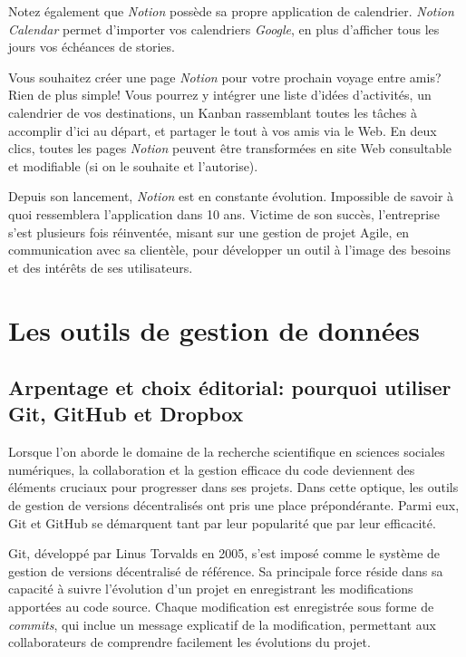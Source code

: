 \documentclass[
  letterpaper,
  DIV=11,
  numbers=noendperiod]{scrreprt}
\begin{document}
Notez également que \emph{Notion} possède sa propre application de
calendrier. \emph{Notion Calendar} permet d'importer vos calendriers
\emph{Google}, en plus d'afficher tous les jours vos échéances de
stories.

Vous souhaitez créer une page \emph{Notion} pour votre prochain voyage
entre amis? Rien de plus simple! Vous pourrez y intégrer une liste
d'idées d'activités, un calendrier de vos destinations, un Kanban
rassemblant toutes les tâches à accomplir d'ici au départ, et partager
le tout à vos amis via le Web. En deux clics, toutes les pages
\emph{Notion} peuvent être transformées en site Web consultable et
modifiable (si on le souhaite et l'autorise).

Depuis son lancement, \emph{Notion} est en constante évolution.
Impossible de savoir à quoi ressemblera l'application dans 10 ans.
Victime de son succès, l'entreprise s'est plusieurs fois réinventée,
misant sur une gestion de projet Agile, en communication avec sa
clientèle, pour développer un outil à l'image des besoins et des
intérêts de ses utilisateurs.

\section{Les outils de gestion de
données}\label{les-outils-de-gestion-de-donnuxe9es}

\subsection{Arpentage et choix éditorial: pourquoi utiliser Git, GitHub
et
Dropbox}\label{arpentage-et-choix-uxe9ditorial-pourquoi-utiliser-git-github-et-dropbox}

Lorsque l'on aborde le domaine de la recherche scientifique en sciences
sociales numériques, la collaboration et la gestion efficace du code
deviennent des éléments cruciaux pour progresser dans ses projets. Dans
cette optique, les outils de gestion de versions décentralisés ont pris
une place prépondérante. Parmi eux, Git et GitHub se démarquent tant par
leur popularité que par leur efficacité.

Git, développé par Linus Torvalds en 2005, s'est imposé comme le système
de gestion de versions décentralisé de référence. Sa principale force
réside dans sa capacité à suivre l'évolution d'un projet en enregistrant
les modifications apportées au code source. Chaque modification est
enregistrée sous forme de \emph{commits}, qui inclue un message
explicatif de la modification, permettant aux collaborateurs de
comprendre facilement les évolutions du projet.
\end{document}

